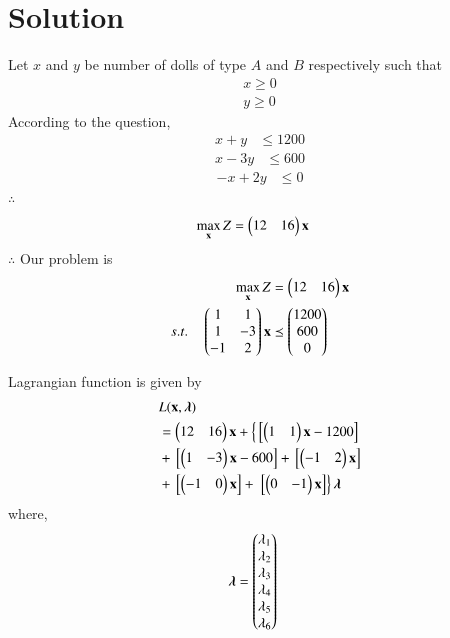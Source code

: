 \documentclass[journal,12pt,twocolumn]{IEEEtran}
\begin{document}
\section{Solution}
Let $x$ and $y$ be number of dolls of type $A$ and $B$ respectively such that 
\begin{align}
    x \geq 0 \\
    y \geq 0 
\end{align}
According to the question,
\begin{align}
    x+y &\leq 1200 
\end{align}
\begin{align}
   x-3y &\leq 600 
\end{align}
\begin{align}
-x+2y&\leq 0
\end{align}
$\therefore$ 
\begin{align}
        \max_{\mathbf{x}} Z &= \begin{pmatrix}12 & 16\end{pmatrix}\mathbf{x}
\end{align}
$\therefore$ Our problem is
\begin{align}
        \max_{\mathbf{x}} Z &= \begin{pmatrix}12 & 16\end{pmatrix}\mathbf{x}\\
        s.t. \quad 
        \begin{pmatrix}1 & 1 \\ 1 & -3 \\ -1 & 2 \end{pmatrix}\mathbf{x} &\preceq \begin{pmatrix}1200\\600\\0\end{pmatrix}
\end{align}

Lagrangian function is given by
\begin{equation}
\begin{aligned}
    &L(\mathbf{x},\boldsymbol{\lambda}) \\ &= \begin{pmatrix}12 & 16\end{pmatrix}\mathbf{x}+\left\{{}\left[\begin{pmatrix}1 & 1\end{pmatrix}\mathbf{x}-1200\right]\right. \\ &+ {}\left[\begin{pmatrix}1 & -3\end{pmatrix}\mathbf{x}-600\right] +{}\left[\begin{pmatrix}-1 & 2\end{pmatrix}\mathbf{x}\right] \\ &+ {}\left[\begin{pmatrix}-1 & 0\end{pmatrix}\mathbf{x}\right] +\left.{}\left[\begin{pmatrix}0 & -1\end{pmatrix}\mathbf{x}\right]\right\}\boldsymbol{\lambda}
\end{aligned}
\end{equation}
where,
\begin{align}
    \boldsymbol{\lambda} &= \begin{pmatrix}\lambda_1 \\ \lambda_2 \\ \lambda_3 \\ \lambda_4 \\ \lambda_5 \\ \lambda_6\end{pmatrix}
\end{align}
\end{document}
